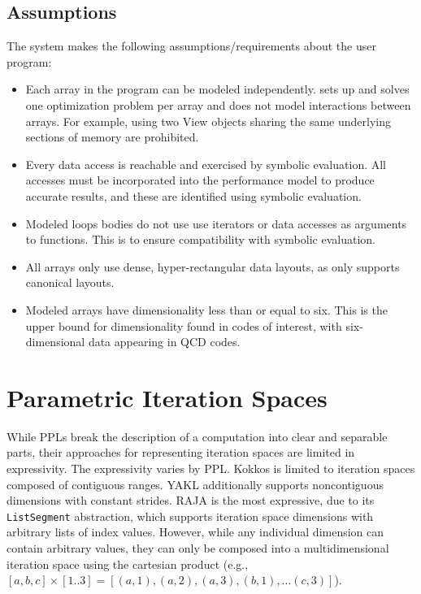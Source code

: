 \subsection{Assumptions}
The \FormatDecisions{} system makes the following assumptions/requirements about the user program:
\begin{itemize}
\item Each array in the program can be modeled independently. \FormatDecisions{} sets up and solves one optimization problem per array and does not model interactions between arrays. For example, using two View objects sharing the same underlying sections of memory are prohibited.
\item Every data access is reachable and exercised by symbolic evaluation. All accesses must be incorporated into the performance model to produce accurate results, and these are identified using symbolic evaluation.
\item Modeled loops bodies do not use use iterators or data accesses as arguments to functions. This is to ensure compatibility with symbolic evaluation.
\item All arrays only use dense, hyper-rectangular data layouts, as \FormatDecisions{} only supports canonical layouts.
\item Modeled arrays have dimensionality less than or equal to six. This is the upper bound for dimensionality found in codes of interest, with six-dimensional data appearing in QCD codes.
\end{itemize}


\section{Parametric Iteration Spaces}

While PPLs break the description of a computation into clear and separable parts, their approaches for representing iteration spaces are limited in expressivity.
The expressivity varies by PPL\@.
Kokkos is limited to iteration spaces composed of contiguous ranges.
YAKL additionally supports noncontiguous dimensions with constant strides.
RAJA is the most expressive, due to its \verb.ListSegment. abstraction, which supports iteration space dimensions with arbitrary lists of index values.
However, while any individual dimension can contain arbitrary values, they can only be composed into a multidimensional iteration space using the cartesian product (e.g., $[a, b, c] \times [1..3] = [(a,1), (a,2), (a,3), (b,1), \dots (c,3)]$).

